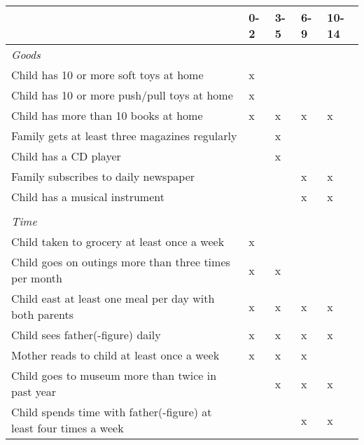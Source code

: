 {
\begin{threeparttable}
	\begin{tabularx}{.97\linewidth}{|l| *{4}{Y|}}
		\hline 
		 & 0-2 & 3-5 & 6-9 & 10-14 \\
		\hline
		\textit{Goods} & & & & \\
		\hspace{3mm} Child has 10 or more soft toys at home & x & & & \\
		\hspace{3mm} Child has 10 or more push/pull toys at home & x & & & \\
		\hspace{3mm} Child has more than 10 books at home & x & x & x & x \\
		\hspace{3mm} Family gets at least three magazines regularly & & x & & \\
		\hspace{3mm} Child has a  CD player & & x & & \\
		\hspace{3mm} Family subscribes to daily newspaper & & & x & x \\
		\hspace{3mm} Child has a musical instrument & & & x & x \\
		& & & & \\
		\textit{Time} & & & & \\
		\hspace{3mm} Child taken to grocery at least once a week & x & & & \\
		\hspace{3mm} Child goes on outings more than three times per month & x & x & & \\
		\hspace{3mm} Child east at least one meal per day with both parents & x & x & x & x \\
		\hspace{3mm} Child sees father(-figure) daily & x & x & x & x \\
		\hspace{3mm} Mother reads to child at least once a week & x & x & x & \\
		\hspace{3mm} Child goes to museum more than twice in past year & & x & x & x \\
		\hspace{3mm} Child spends time with father(-figure) at least four times a week &  &  & x & x \\

\end{tabularx}
\end{threeparttable}}
